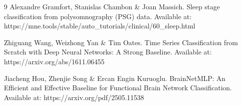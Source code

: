 \begin{thebibliography}{9}
Alexandre Gramfort, Stanislas Chambon \& Joan Massich. Sleep stage classification from polysomnography (PSG) data. Available at: https://mne.tools/stable/auto\_tutorials/clinical/60\_sleep.html

Zhiguang Wang, Weizhong Yan \& Tim Oates. Time Series Classification from Scratch with Deep Neural Networks: A Strong Baseline. Available at: https://arxiv.org/abs/1611.06455

Jiacheng Hou, Zhenjie Song \& Ercan Engin Kuruoglu. BrainNetMLP: An Efficient and Effective Baseline for Functional Brain Network Classification. Available at: https://arxiv.org/pdf/2505.11538

\end{thebibliography}


